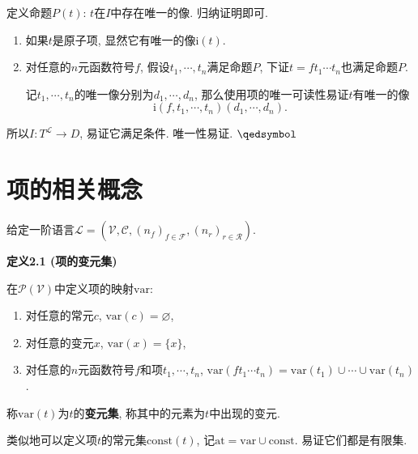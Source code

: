 定义命题$P(t)$: $t$在$I$中存在唯一的像. 归纳证明即可.

\begin{enumerate}
    \item 如果$t$是原子项, 显然它有唯一的像$\mathrm{i}(t)$.
    \item 对任意的$n$元函数符号$f$, 假设$t_1,\cdots,t_n$满足命题$P$,
    下证$t=ft_1\cdots t_n$也满足命题$P$.

    \hspace{2.17em}
    记$t_1,\cdots, t_n$的唯一像分别为$d_1,\cdots,d_n$,
    那么使用项的唯一可读性易证$t$有唯一的像
    \[
        \mathrm{i}(f,t_1,\cdots,t_n)(d_1,\cdots,d_n).
    \]
\end{enumerate}

所以$I:T^{\mathcal{L}}\to D$, 易证它满足条件. 唯一性易证. \hfill $\qedsymbol$





\newpage

\section{项的相关概念}

给定一阶语言$\mathcal{L}=
(\mathcal{V},\mathcal{C},(n_f)_{f\in\mathcal{F}},(n_r)_{r\in\mathcal{R}})$.

\vspace{10pt}

\hypertarget{sec:定义2.1}{}
\noindent\textbf{定义2.1 (项的变元集)}

在$\mathcal{P}(\mathcal{V})$中定义项的映射$\mathrm{var}$:
\begin{enumerate}
    \item 对任意的常元$c$, $\mathrm{var}(c)=\varnothing$,
    \item 对任意的变元$x$, $\mathrm{var}(x)=\{x\}$,
    \item 对任意的$n$元函数符号$f$和项$t_1,\cdots,t_n$,
    $\mathrm{var}(ft_1\cdots t_n)=\mathrm{var}(t_1)\cup\cdots\cup\mathrm{var}(t_n)$.
\end{enumerate}

称$\mathrm{var}(t)$为$t$的\textbf{变元集}, 称其中的元素为$t$中出现的变元.

\vspace{10pt}

类似地可以定义项$t$的常元集$\mathrm{const}(t)$,
记$\mathrm{at}=\mathrm{var}\cup\mathrm{const}$. 易证它们都是有限集.

\vspace{10pt}

